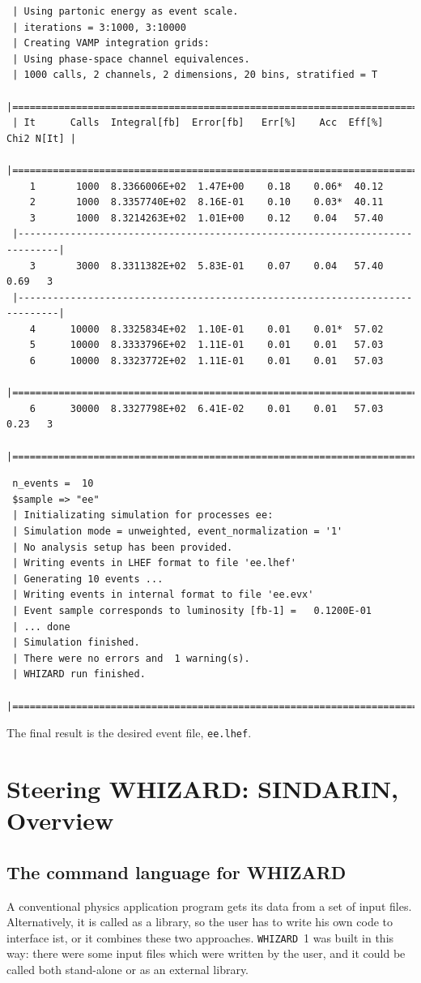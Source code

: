 \documentclass[12pt]{book}
\newcommand{\ttt}[1]{\texttt{#1}}
\newcommand{\whizard}{\texttt{WHIZARD}}
\begin{document}
\begin{footnotesize}
 \begin{verbatim}
 | Using partonic energy as event scale.
 | iterations = 3:1000, 3:10000
 | Creating VAMP integration grids:
 | Using phase-space channel equivalences.
 | 1000 calls, 2 channels, 2 dimensions, 20 bins, stratified = T
 |=============================================================================|
 | It      Calls  Integral[fb]  Error[fb]   Err[%]    Acc  Eff[%]   Chi2 N[It] |
 |=============================================================================|
    1       1000  8.3366006E+02  1.47E+00    0.18    0.06*  40.12
    2       1000  8.3357740E+02  8.16E-01    0.10    0.03*  40.11
    3       1000  8.3214263E+02  1.01E+00    0.12    0.04   57.40
 |-----------------------------------------------------------------------------|
    3       3000  8.3311382E+02  5.83E-01    0.07    0.04   57.40    0.69   3
 |-----------------------------------------------------------------------------|
    4      10000  8.3325834E+02  1.10E-01    0.01    0.01*  57.02
    5      10000  8.3333796E+02  1.11E-01    0.01    0.01   57.03
    6      10000  8.3323772E+02  1.11E-01    0.01    0.01   57.03
 |=============================================================================|
    6      30000  8.3327798E+02  6.41E-02    0.01    0.01   57.03    0.23   3
 |=============================================================================|
 \end{verbatim}

 \begin{verbatim}
 n_events =  10
 $sample => "ee"
 | Initializating simulation for processes ee:
 | Simulation mode = unweighted, event_normalization = '1'
 | No analysis setup has been provided.
 | Writing events in LHEF format to file 'ee.lhef'
 | Generating 10 events ...
 | Writing events in internal format to file 'ee.evx'
 | Event sample corresponds to luminosity [fb-1] =   0.1200E-01
 | ... done
 | Simulation finished.
 | There were no errors and  1 warning(s).
 | WHIZARD run finished.
 |=============================================================================|
 \end{verbatim}
 \end{footnotesize}
The final result is the desired event file, \ttt{ee.lhef}.


\chapter{Steering WHIZARD: SINDARIN, Overview}

\section{The command language for WHIZARD}
A conventional physics application program gets its data from a set of input
files.  Alternatively, it is called as a library, so the user has to write his
own code to interface ist, or it combines these two approaches.  \whizard~1 was
built in this way: there were some input files which were written by the user,
and it could be called both stand-alone or as an external library.
\end{document}
